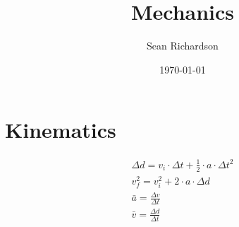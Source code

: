 \documentclass[11pt]{article}{}
\begin{document}
	\title{Mechanics}
	\author{Sean Richardson}
	\date{\today}
	\maketitle
	\section{Kinematics}
		\begin{align*}
			\Delta d=v_i\cdot \Delta t + \frac{1}{2}\cdot a \cdot \Delta t^2 \\
			v_f^2 = v_i^2 + 2\cdot a\cdot \Delta d \\
			\bar{a} = \frac{\Delta v}{\Delta t} \\
			\bar{v} = \frac{\Delta d}{\Delta t} 
		\end{align*}
\end{document}
